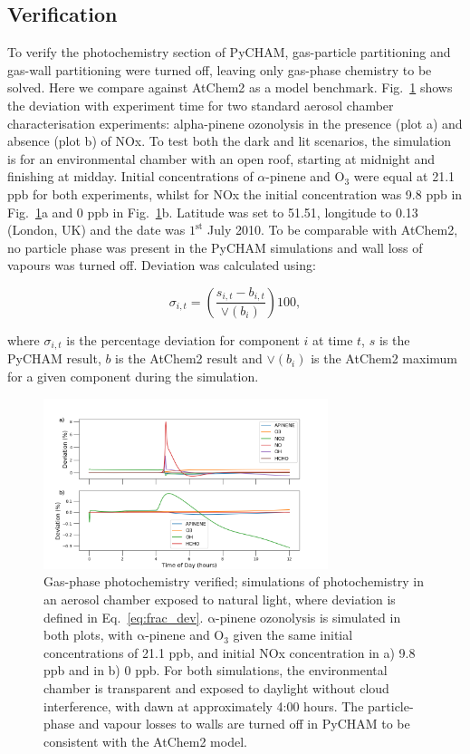 \documentclass[gmd, manuscript]{copernicus}
\begin{document}
\subsection{Verification}
To verify the photochemistry section of PyCHAM, gas-particle partitioning and gas-wall partitioning were turned off, leaving only gas-phase chemistry to be solved.  Here we compare against AtChem2 \citep{sommariva_acm2018} as a model benchmark.  Fig.~\ref{fig:GasChemVer1} shows the deviation with experiment time for two standard aerosol chamber characterisation experiments: alpha-pinene ozonolysis in the presence (plot a) and absence (plot b) of NOx.  To test both the dark and lit scenarios, the simulation is for an environmental chamber with an open roof, starting at midnight and finishing at midday.  Initial concentrations of $\alpha$-pinene and O$_3$ were equal at 21.1 ppb for both experiments, whilst for NOx the initial concentration was 9.8 ppb in Fig.~\ref{fig:GasChemVer1}a and 0 ppb in Fig.~\ref{fig:GasChemVer1}b.  Latitude was set to 51.51, longitude to 0.13 (London, UK) and the date was $\mathrm{1^{st}}$ July 2010.  To be comparable with AtChem2, no particle phase was present in the PyCHAM simulations and wall loss of vapours was turned off.  Deviation was calculated using:

\begin{equation} \label{eq:frac_dev}
\sigma_{i,t} = \left(\frac{s_{i,t}-b_{i,t}}{\lor(b_{i})}\right)100\mathrm{,}
\end{equation}

where $\sigma_{i,t}$ is the percentage deviation for component $i$ at time $t$, $s$ is the PyCHAM result, $b$ is the AtChem2 result and $\lor(b_{i})$ is the AtChem2 maximum for a given component during the simulation.

\begin{figure}[t]
\includegraphics[width=8.3cm]{Results/photo_chem_conc_dev.png}
\caption{Gas-phase photochemistry verified; simulations of photochemistry in an aerosol chamber exposed to natural light, where deviation is defined in Eq.~\ref{eq:frac_dev}.  $\mathrm{\alpha}$-pinene ozonolysis is simulated in both plots, with $\mathrm{\alpha}$-pinene and O$_3$ given the same initial concentrations of 21.1 ppb, and initial NOx concentration in a) 9.8 ppb and in b) 0 ppb.  For both simulations, the environmental chamber is transparent and exposed to daylight without cloud interference, with dawn at approximately 4:00 hours.  The particle-phase and vapour losses to walls are turned off in PyCHAM to be consistent with the AtChem2 model.}
\label{fig:GasChemVer1}
\end{figure}
\end{document}
